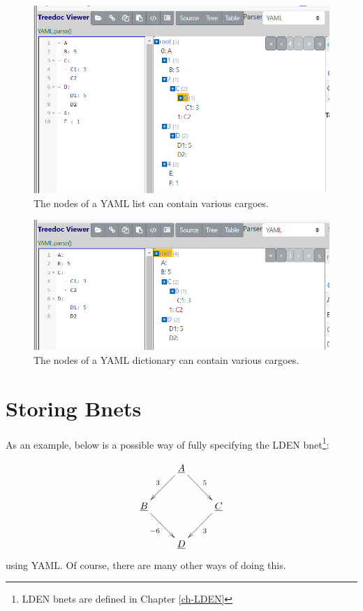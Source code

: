 \begin{figure}[h!]
\centering
\includegraphics[width=6in]
{yaml/yaml-list-nodes.jpg}
\caption{The  nodes of a YAML list can contain various cargoes.}
\label{fig-yaml-list-nodes}
\end{figure}

\begin{figure}[h!]
\centering
\includegraphics[width=6in]
{yaml/yaml-dict-nodes.jpg}
\caption{The nodes of a YAML dictionary can contain various cargoes. }
\label{fig-yaml-dict-nodes}
\end{figure}

\section{Storing Bnets}

As an example, below is a
possible way of
fully specifying the LDEN
 bnet\footnote{LDEN bnets are defined in Chapter \ref{ch-LDEN}}:

$$
\xymatrix{
&\ul{A}\ar[dl]_3\ar[dr]^5
\\
\ul{B}\ar[dr]_{-6} & &\ul{C}\ar[dl]^{3} \\
&\ul{D}
}
$$
using YAML. Of course,
there are
many other ways of
doing this.


